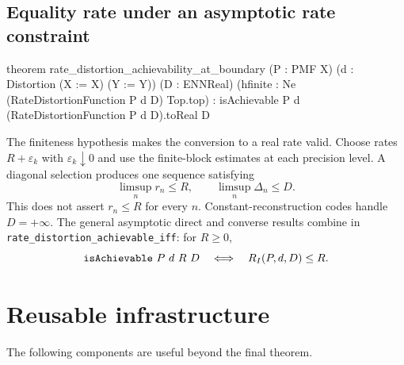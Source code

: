\documentclass[11pt]{article}
\newcommand{\RD}{R_I}
\begin{document}
\subsection{Equality rate under an asymptotic rate constraint}
\begin{LeanCode}
theorem rate_distortion_achievability_at_boundary
    (P : PMF X) (d : Distortion (X := X) (Y := Y)) (D : ENNReal)
    (hfinite : Ne (RateDistortionFunction P d D) Top.top) :
    isAchievable P d (RateDistortionFunction P d D).toReal D
\end{LeanCode}
The finiteness hypothesis makes the conversion to a real rate valid. Choose rates $R+\varepsilon_k$ with
$\varepsilon_k\downarrow0$ and use the finite-block estimates at each
precision level. A diagonal selection produces one sequence satisfying
\[
  \limsup_n r_n\le R,\qquad \limsup_n\Delta_n\le D.
\]
This does not assert $r_n\le R$ for every $n$. Constant-reconstruction codes
handle $D=+\infty$. The general asymptotic direct and converse results combine
in \texttt{rate\_\allowbreak distortion\_\allowbreak achievable\_\allowbreak iff}: for $R\ge0$,
\[
 \texttt{is\allowbreak Achievable}\ P\ d\ R\ D
 \quad\Longleftrightarrow\quad \RD(P,d,D)\le R.
\]

\section{Reusable infrastructure}

The following components are useful beyond the final theorem.
\end{document}
